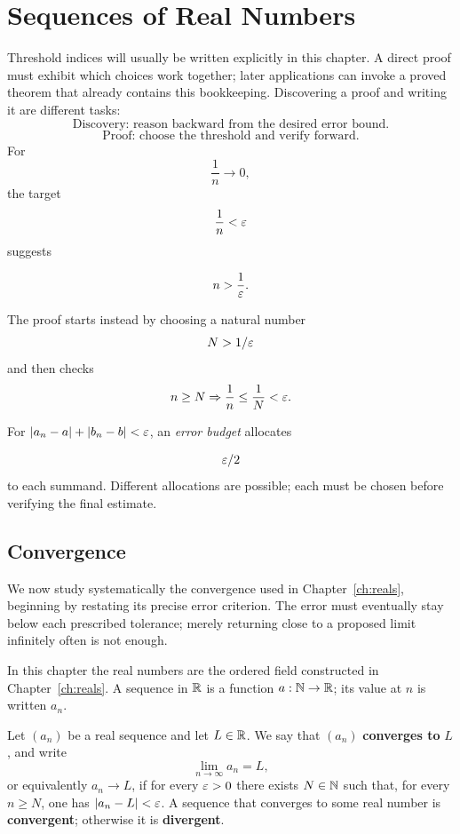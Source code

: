 \chapter{Sequences of Real Numbers}
\label{ch:sequences}

Threshold indices will usually be written explicitly in this chapter. A
direct proof must exhibit which choices work together; later applications
can invoke a proved theorem that already contains this bookkeeping.
Discovering a proof and writing it are different tasks:
\[
\boxed{\text{Discovery: reason backward from the desired error bound.}}
\]
\[
\boxed{\text{Proof: choose the threshold and verify forward.}}
\]
For
\[
\frac1n\to0,
\]
 the target
\[
\frac1n<\varepsilon
\]
 suggests

\[
n>\frac1{\varepsilon}.
\]

The proof starts instead by choosing a natural number
\[
N>1/\varepsilon
\]
 and
then checks
\[
n\geq N\Rightarrow \frac1n\leq\frac1N<\varepsilon.
\]

For $|a_n-a|+|b_n-b|<\varepsilon$, an \emph{error budget} allocates

\[
\varepsilon/2
\]
 to each summand. Different allocations are possible; each
must be chosen before verifying the final estimate.

\section{Convergence}

We now study systematically the convergence used in Chapter~\ref{ch:reals},
beginning by restating its precise error criterion.
The error must eventually stay below each prescribed tolerance; merely
returning close to a proposed limit infinitely often is not enough.


In this chapter the real numbers are the ordered field constructed in Chapter~\ref{ch:reals}. A sequence in $\mathbb{R}$ is a function $a:\mathbb{N}\to\mathbb{R}$; its value at $n$ is written $a_n$.

\begin{definition}
\label{def:sequence-limit}
Let $(a_n)$ be a real sequence and let $L\in\mathbb{R}$. We say that $(a_n)$ \textbf{converges to} $L$, and write
\[
\lim_{n\to\infty}a_n=L,
\]
or equivalently $a_n\to L$, if for every $\varepsilon>0$ there exists $N\in\mathbb{N}$ such that, for every $n\geq N$, one has $\lvert a_n-L\rvert<\varepsilon$. A sequence that converges to some real number is \textbf{convergent}; otherwise it is \textbf{divergent}.
\end{definition}

